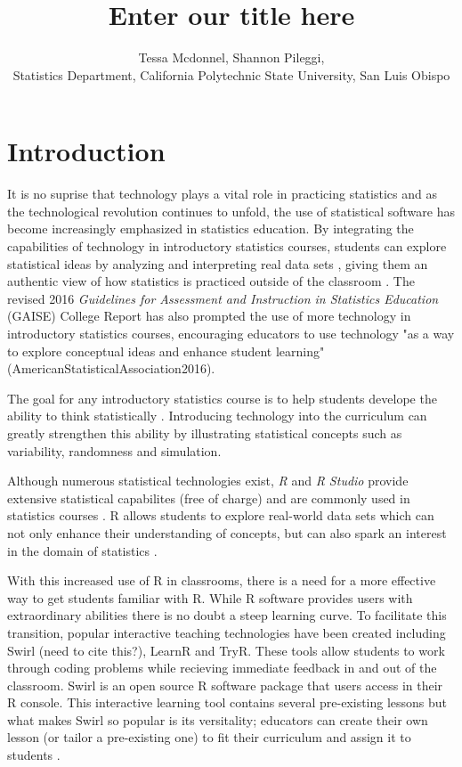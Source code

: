 \documentclass{tise_style}
\title{Enter our title here}
\author{Tessa Mcdonnel, Shannon Pileggi,  \\Statistics Department, California Polytechnic State University, San Luis Obispo}
\begin{document}
\section{Introduction}

It is no suprise that technology plays a vital role in practicing statistics and as the technological revolution continues to 
unfold, the use of statistical software has become increasingly emphasized in statistics education. By integrating the 
capabilities of technology in introductory statistics courses, students can explore statistical ideas by analyzing and 
interpreting real data sets \citep{Chance2007}, giving them an authentic view of how statistics is practiced outside of the 
classroom \citep{Wang2017}. The revised 2016 \textit{Guidelines for Assessment and Instruction in Statistics Education} 
(GAISE) College Report has also prompted the use of more technology in introductory statistics courses, encouraging educators 
to use technology "as a way to explore conceptual ideas and enhance student learning" (AmericanStatisticalAssociation2016).

The goal for any introductory statistics course is to help students develope the ability to think statistically 
\citep{AmericanStatisticalAssociation2016}. 
Introducing technology into the curriculum can greatly strengthen this ability by illustrating statistical concepts such as
variability, randomness and simulation.

Although numerous statistical technologies exist, \textit{R} and \textit{R Studio} provide extensive statistical capabilites 
(free of charge) and are commonly used in statistics courses \citep{Chance2007}. R allows students to explore real-world data 
sets which can not only enhance their understanding of concepts, but can also spark an interest in the domain of statistics 
\citep{Wang2017}.

With this increased use of R in classrooms, there is a need for a more effective way to get students familiar with R. While R
software provides users with extraordinary abilities there is no doubt a steep learning curve. To facilitate this transition,
popular interactive teaching technologies have been created including Swirl (need to cite this?), LearnR and TryR. These tools 
allow students to work through coding problems while recieving immediate feedback in and out of the classroom. Swirl is an open source R software package 
that users access in their R console. This interactive learning tool contains several pre-existing lessons but what makes 
Swirl so popular is its versitality; educators can create their own lesson (or tailor a pre-existing one) to fit their 
curriculum and assign it to students \citep{Carchedi2014}. 
\end{document}
